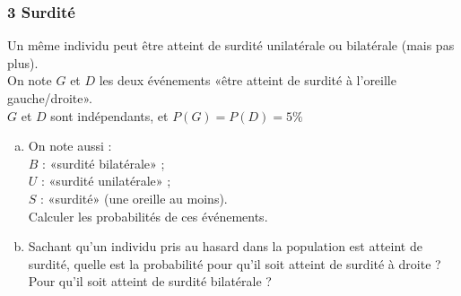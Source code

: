 \documentclass[a4paper,11pt]{article} \usepackage{FBarticle} \mapage{831}{Probabilités 1} %
\begin{document}
\begin{multicols}{2}
\vfill\null\columnbreak

\subsubsection*{3 Surdité}
Un même individu peut être atteint de surdité unilatérale ou bilatérale (mais pas plus). \\
On note $G$ et $D$ les deux événements «être atteint de surdité à l'oreille gauche/droite».\\
$G$ et $D$ sont indépendants, et $P(G)=P(D)=5\%$\\
\begin{enumerate}[a)]
\item On note aussi :\\
$B$ : «surdité bilatérale» ;\\
$U$ : «surdité unilatérale» ;\\
$S$ : «surdité» (une oreille au moins).\\
Calculer les probabilités de ces événements.
\item Sachant qu'un individu pris au hasard dans la population est atteint de surdité, quelle est la probabilité pour qu'il soit atteint de surdité à droite ? Pour qu'il soit atteint de surdité bilatérale ?
\end{enumerate}



\end{multicols}
\end{document}
